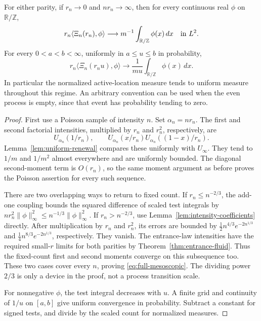 \documentclass[11pt,letterpaper]{article}
\newcommand{\T}{\mathbb R/\mathbb Z}\newcommand{\Leb}{\operatorname{Leb}}
\begin{document}
\begin{theorem}
\label{thm:full-mesoscopic}
For either parity, if $r_n\to0$ and
$nr_n\to\infty$, then for every continuous real $\phi$ on $\T$,
\begin{equation}\label{eq:full-mesoscopic}
 r_n\langle\Xi_n(r_n),\phi\rangle
       \longrightarrow m^{-1}\int_{\T}\phi(x)\,dx\quad\hbox{in }L^2.
\end{equation}
For every $0<a<b<\infty$, uniformly in $a\le u\le b$ in probability,
\[
 r_n\langle\Xi_n(r_nu),\phi\rangle
       \longrightarrow \frac1{mu}\int_{\T}\phi(x)\,dx.
\]
In particular the normalized active-location measure tends to uniform
measure throughout this regime. An arbitrary convention can be used when
the even process is empty, since that event has probability tending to zero.
\end{theorem}
\begin{proof}
First use a Poisson sample of intensity $n$. Set $\alpha_n=nr_n$.
The first and second factorial intensities, multiplied by $r_n$ and
$r_n^2$, respectively, are
\[
 U_{\alpha_n}(1/r_n),\qquad
 U_{\alpha_n}(x/r_n)U_{\alpha_n}((1-x)/r_n).
\]
Lemma~\ref{lem:uniform-renewal} compares these uniformly with $U_\infty$.
They tend to $1/m$ and $1/m^2$ almost everywhere and are uniformly
bounded. The diagonal second-moment term is $O(r_n)$, so the same moment
argument as before proves the Poisson assertion for every such sequence.

There are two overlapping ways to return to fixed count. If
$r_n\le n^{-2/3}$, the add-one coupling bounds the squared difference
of scaled test integrals by
$nr_n^2\|\phi\|_\infty^2\le n^{-1/3}\|\phi\|_\infty^2$.
If $r_n>n^{-2/3}$, use Lemma~\ref{lem:intensity-coefficients} directly.
After multiplication by $r_n$ and $r_n^2$, its errors are bounded by
$\tfrac12n^{4/3}e^{-2n^{1/3}}$ and
$\tfrac14n^{8/3}e^{-2n^{1/3}}$, respectively. They vanish. The entrance-law
intensities have the required small-$r$ limits for both parities by
Theorem~\ref{thm:entrance-fluid}. Thus the fixed-count first and second
moments converge on this subsequence too. These two cases cover every
$n$, proving \eqref{eq:full-mesoscopic}. The dividing power $2/3$ is only
a device in the proof, not a process transition scale.

For nonnegative $\phi$, the test integral decreases with $u$.
A finite grid and continuity of $1/u$ on $[a,b]$ give uniform convergence
in probability. Subtract a constant for signed tests, and divide by the
scaled count for normalized measures.
\end{proof}
\end{document}
